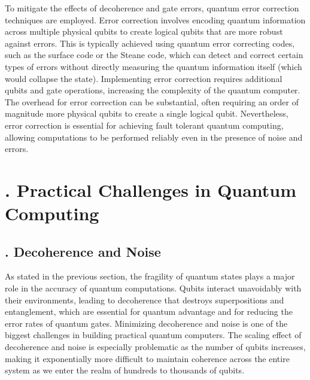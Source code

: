 \documentclass{elbioimp2}
\begin{document}
To mitigate the effects of decoherence and gate errors, quantum error correction techniques are employed. Error correction involves encoding quantum information across multiple physical qubits to create logical qubits that are more robust against errors. This is typically achieved using quantum error correcting codes, such as the surface code or the Steane code, which can detect and correct certain types of errors without directly measuring the quantum information itself (which would collapse the state). Implementing error correction requires additional qubits and gate operations, increasing the complexity of the quantum computer. The overhead for error correction can be substantial, often requiring an order of magnitude more physical qubits to create a single logical qubit. Nevertheless, error correction is essential for achieving fault tolerant quantum computing, allowing computations to be performed reliably even in the presence of noise and errors.


\section{. Practical Challenges in Quantum Computing}
\subsection{. Decoherence and Noise}
As stated in the previous section, the fragility of quantum states plays a major role in the accuracy of quantum computations. Qubits interact unavoidably with their environments, leading to decoherence that destroys superpositions and entanglement, which are essential for quantum advantage and for reducing the error rates of quantum gates. Minimizing decoherence and noise is one of the biggest challenges in building practical quantum computers. The scaling effect of decoherence and noise is especially problematic as the number of qubits increases, making it exponentially more difficult to maintain coherence across the entire system as we enter the realm of hundreds to thousands of qubits.
\end{document}
